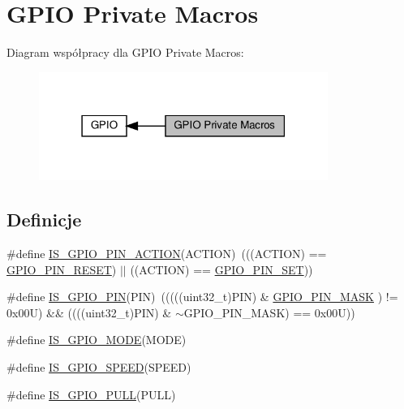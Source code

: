 \hypertarget{group___g_p_i_o___private___macros}{}\section{G\+P\+IO Private Macros}
\label{group___g_p_i_o___private___macros}
Diagram współpracy dla G\+P\+IO Private Macros\+:\nopagebreak
\begin{figure}[H]
\begin{center}
\leavevmode
\includegraphics[width=267pt]{group___g_p_i_o___private___macros}
\end{center}
\end{figure}
\subsection*{Definicje}
\begin{DoxyCompactItemize}
\item 
\#define \hyperlink{group___g_p_i_o___private___macros_ga6da646a4924c5cfae3024c660476f26f}{I\+S\+\_\+\+G\+P\+I\+O\+\_\+\+P\+I\+N\+\_\+\+A\+C\+T\+I\+ON}(A\+C\+T\+I\+ON)~(((A\+C\+T\+I\+ON) == \hyperlink{group___g_p_i_o___exported___types_gga5b3ef0486b179415581eb342e0ea6b43a90af2af95004ea61d76950ff3f2f6ec2}{G\+P\+I\+O\+\_\+\+P\+I\+N\+\_\+\+R\+E\+S\+ET}) $\vert$$\vert$ ((A\+C\+T\+I\+ON) == \hyperlink{group___g_p_i_o___exported___types_gga5b3ef0486b179415581eb342e0ea6b43a746c062509db3ad1e47beed7527f9f8a}{G\+P\+I\+O\+\_\+\+P\+I\+N\+\_\+\+S\+ET}))
\item 
\#define \hyperlink{group___g_p_i_o___private___macros_gad6ec74e33360395535ad5d91ba6d4781}{I\+S\+\_\+\+G\+P\+I\+O\+\_\+\+P\+IN}(P\+IN)~(((((uint32\+\_\+t)P\+IN) \& \hyperlink{group___g_p_i_o__pins__define_gab135afee57cdef0f647ab153f88b6d2f}{G\+P\+I\+O\+\_\+\+P\+I\+N\+\_\+\+M\+A\+SK} ) != 0x00\+U) \&\& ((((uint32\+\_\+t)\+P\+I\+N) \& $\sim$\+G\+P\+I\+O\+\_\+\+P\+I\+N\+\_\+\+M\+A\+S\+K) == 0x00\+U))
\item 
\#define \hyperlink{group___g_p_i_o___private___macros_gacc5fde3eef57ec3c558c11d0011d900c}{I\+S\+\_\+\+G\+P\+I\+O\+\_\+\+M\+O\+DE}(M\+O\+DE)
\item 
\#define \hyperlink{group___g_p_i_o___private___macros_ga888e1f951df2fe9dbf827528051a3a56}{I\+S\+\_\+\+G\+P\+I\+O\+\_\+\+S\+P\+E\+ED}(S\+P\+E\+ED)
\item 
\#define \hyperlink{group___g_p_i_o___private___macros_ga1cb9706d23fb79584aae41e5e503f3cd}{I\+S\+\_\+\+G\+P\+I\+O\+\_\+\+P\+U\+LL}(P\+U\+LL)
\end{DoxyCompactItemize}


